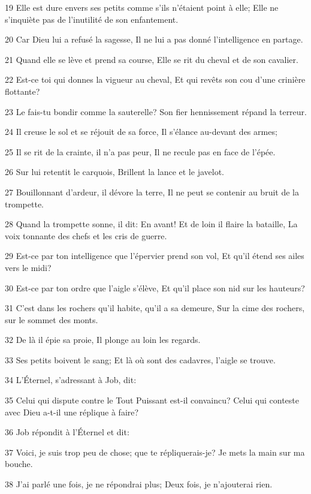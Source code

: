 \par 19 Elle est dure envers ses petits comme s'ils n'étaient point à elle; Elle ne s'inquiète pas de l'inutilité de son enfantement.
\par 20 Car Dieu lui a refusé la sagesse, Il ne lui a pas donné l'intelligence en partage.
\par 21 Quand elle se lève et prend sa course, Elle se rit du cheval et de son cavalier.
\par 22 Est-ce toi qui donnes la vigueur au cheval, Et qui revêts son cou d'une crinière flottante?
\par 23 Le fais-tu bondir comme la sauterelle? Son fier hennissement répand la terreur.
\par 24 Il creuse le sol et se réjouit de sa force, Il s'élance au-devant des armes;
\par 25 Il se rit de la crainte, il n'a pas peur, Il ne recule pas en face de l'épée.
\par 26 Sur lui retentit le carquois, Brillent la lance et le javelot.
\par 27 Bouillonnant d'ardeur, il dévore la terre, Il ne peut se contenir au bruit de la trompette.
\par 28 Quand la trompette sonne, il dit: En avant! Et de loin il flaire la bataille, La voix tonnante des chefs et les cris de guerre.
\par 29 Est-ce par ton intelligence que l'épervier prend son vol, Et qu'il étend ses ailes vers le midi?
\par 30 Est-ce par ton ordre que l'aigle s'élève, Et qu'il place son nid sur les hauteurs?
\par 31 C'est dans les rochers qu'il habite, qu'il a sa demeure, Sur la cime des rochers, sur le sommet des monts.
\par 32 De là il épie sa proie, Il plonge au loin les regards.
\par 33 Ses petits boivent le sang; Et là où sont des cadavres, l'aigle se trouve.
\par 34 L'Éternel, s'adressant à Job, dit:
\par 35 Celui qui dispute contre le Tout Puissant est-il convaincu? Celui qui conteste avec Dieu a-t-il une réplique à faire?
\par 36 Job répondit à l'Éternel et dit:
\par 37 Voici, je suis trop peu de chose; que te répliquerais-je? Je mets la main sur ma bouche.
\par 38 J'ai parlé une fois, je ne répondrai plus; Deux fois, je n'ajouterai rien.

